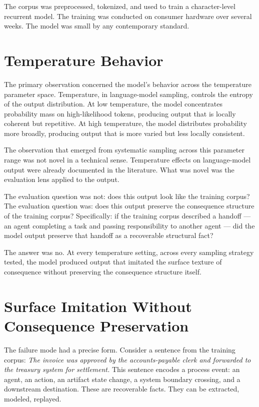 The corpus was preprocessed, tokenized, and used to train a character-level recurrent model. The training was conducted on consumer hardware over several weeks. The model was small by any contemporary standard.

\section{Temperature Behavior}

The primary observation concerned the model's behavior across the temperature parameter space. Temperature, in language-model sampling, controls the entropy of the output distribution. At low temperature, the model concentrates probability mass on high-likelihood tokens, producing output that is locally coherent but repetitive. At high temperature, the model distributes probability more broadly, producing output that is more varied but less locally consistent.

The observation that emerged from systematic sampling across this parameter range was not novel in a technical sense. Temperature effects on language-model output were already documented in the literature. What was novel was the evaluation lens applied to the output.

The evaluation question was not: does this output look like the training corpus? The evaluation question was: does this output preserve the consequence structure of the training corpus? Specifically: if the training corpus described a handoff --- an agent completing a task and passing responsibility to another agent --- did the model output preserve that handoff as a recoverable structural fact?

The answer was no. At every temperature setting, across every sampling strategy tested, the model produced output that imitated the surface texture of consequence without preserving the consequence structure itself.

\section{Surface Imitation Without Consequence Preservation}

The failure mode had a precise form. Consider a sentence from the training corpus: \textit{The invoice was approved by the accounts-payable clerk and forwarded to the treasury system for settlement.} This sentence encodes a process event: an agent, an action, an artifact state change, a system boundary crossing, and a downstream destination. These are recoverable facts. They can be extracted, modeled, replayed.

